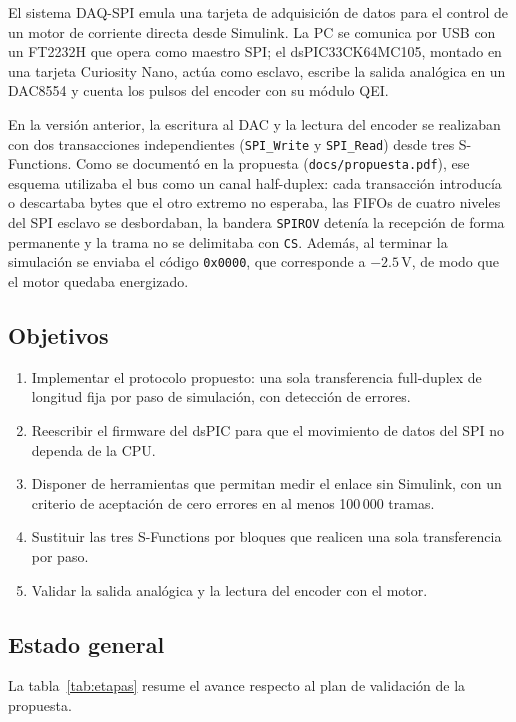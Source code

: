 \documentclass[11pt]{article}
\newcommand{\code}[1]{\texttt{#1}}
\begin{document}
El sistema DAQ-SPI emula una tarjeta de adquisición de datos para el control
de un motor de corriente directa desde Simulink. La PC se comunica por USB con
un FT2232H que opera como maestro SPI; el dsPIC33CK64MC105, montado en una
tarjeta Curiosity Nano, actúa como esclavo, escribe la salida analógica en un
DAC8554 y cuenta los pulsos del encoder con su módulo QEI.

En la versión anterior, la escritura al DAC y la lectura del encoder se
realizaban con dos transacciones independientes (\code{SPI\_Write} y
\code{SPI\_Read}) desde tres S-Functions. Como se documentó en la propuesta
(\code{docs/propuesta.pdf}), ese esquema utilizaba el bus como un canal
half-duplex: cada transacción introducía o descartaba bytes que el otro
extremo no esperaba, las FIFOs de cuatro niveles del SPI esclavo se
desbordaban, la bandera \code{SPIROV} detenía la recepción de forma
permanente y la trama no se delimitaba con \code{CS}. Además, al terminar la
simulación se enviaba el código \code{0x0000}, que corresponde a $-2.5$\,V, de
modo que el motor quedaba energizado.

\subsection{Objetivos}

\begin{enumerate}
\item Implementar el protocolo propuesto: una sola transferencia full-duplex
  de longitud fija por paso de simulación, con detección de errores.
\item Reescribir el firmware del dsPIC para que el movimiento de datos del SPI
  no dependa de la CPU.
\item Disponer de herramientas que permitan medir el enlace sin Simulink,
  con un criterio de aceptación de cero errores en al menos 100\,000 tramas.
\item Sustituir las tres S-Functions por bloques que realicen una sola
  transferencia por paso.
\item Validar la salida analógica y la lectura del encoder con el motor.
\end{enumerate}

\subsection{Estado general}

La tabla~\ref{tab:etapas} resume el avance respecto al plan de validación de
la propuesta.
\end{document}
